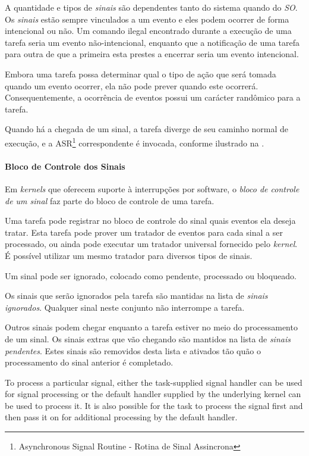 A quantidade e tipos de \emph{sinais} são dependentes tanto do sistema quando do \emph{SO}. Os \emph{sinais} estão sempre vinculados a um evento e eles podem ocorrer de forma intencional ou não. Um comando ilegal encontrado durante a execução de uma tarefa seria um evento não-intencional, enquanto que a notificação de uma tarefa para outra de que a primeira esta prestes a encerrar seria um evento intencional.

Embora uma tarefa possa determinar qual o tipo de ação que será tomada quando um evento ocorrer, ela não pode prever quando este ocorrerá. Consequentemente, a ocorrência de eventos possui um carácter randômico para a tarefa. 

Quando há a chegada de um sinal, a tarefa diverge de seu caminho normal de execução, e a ASR\footnote{Asynchronous Signal Routine - Rotina de Sinal Assincrona} correspondente é invocada, conforme ilustrado na .


\paragraph{Bloco de Controle dos Sinais}

Em \emph{kernels} que oferecem suporte à interrupções por software, o \emph{bloco de controle de um sinal} faz parte do bloco de controle de uma tarefa.

Uma tarefa pode registrar no bloco de controle do sinal quais eventos ela deseja tratar. Esta tarefa pode prover um tratador de eventos para cada sinal a ser processado, ou ainda pode executar um tratador universal fornecido pelo \emph{kernel}. É possível utilizar um mesmo tratador para diversos tipos de sinais.

Um sinal pode ser ignorado, colocado como pendente, processado ou bloqueado.

Os sinais que serão ignorados pela tarefa são mantidas na lista de \emph{sinais ignorados}. Qualquer sinal neste conjunto não interrompe a tarefa.

Outros sinais podem chegar enquanto a tarefa estiver no meio do processamento de um sinal. Os sinais extras que vão chegando são mantidos na lista de \emph{sinais pendentes}. Estes sinais são removidos desta lista e ativados tão quão o processamento do sinal anterior é completado.

To process a particular signal, either the task-supplied signal handler can be used for signal processing or the default handler supplied by the underlying kernel can be used to process it. It is also possible for the task to process the signal first and then pass it on for additional processing by the default handler.

